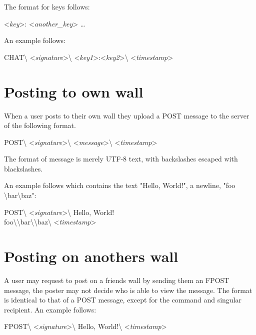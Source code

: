 The format for keys follows:

\begin{center}
\textless \textit{key}\textgreater:
\textless \textit{another\_key}\textgreater
\ldots
\end{center}

An example follows:

\begin{center}
CHAT\textbackslash
\textless \textit{signature}\textgreater\textbackslash
\textless \textit{key1}\textgreater:\textless \textit{key2}\textgreater\textbackslash
\textless \textit{timestamp}\textgreater
\end{center}

\section{Posting to own wall}
When a user posts to their own wall they upload a POST message to the server of
the following format.

\begin{center}
POST\textbackslash
\textless \textit{signature}\textgreater\textbackslash
\textless \textit{message}\textgreater\textbackslash
\textless \textit{timestamp}\textgreater
\end{center}

The format of message is merely UTF-8 text, with backslashes escaped with
blackslashes.

An example follows which contains the text "Hello, World!", a newline, "foo
\textbackslash bar\textbackslash baz":

\begin{center}
POST\textbackslash
\textless \textit{signature}\textgreater\textbackslash
Hello, World!\\
foo\textbackslash\textbackslash bar\textbackslash\textbackslash baz\textbackslash
\textless \textit{timestamp}\textgreater
\end{center}

\section{Posting on anothers wall}
A user may request to post on a friends wall by sending them an FPOST message,
the poster may not decide who is able to view the message. The format is
identical to that of a POST message, except for the command and singular
recipient. An example follows:

\begin{center}
FPOST\textbackslash
\textless \textit{signature}\textgreater\textbackslash
Hello, World!\textbackslash
\textless \textit{timestamp}\textgreater
\end{center}

